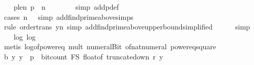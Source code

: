 \begin{isabellebody}
\isanewline
\ \ \isamarkupfalse%
\ p{\isacharunderscore}{\kern0pt}le{\isacharunderscore}{\kern0pt}n{\isacharcolon}{\kern0pt}\ {\isachardoublequoteopen}p\ {\isasymle}\ {}{\isacharasterisk}{\kern0pt}n\ {\isacharplus}{\kern0pt}\ {}{}{\isachardoublequoteclose}\isanewline
\ \ \ \ \isamarkupfalse%
\ {\isacharparenleft}{\kern0pt}simp\ add{\isacharcolon}{\kern0pt}p{\isacharunderscore}{\kern0pt}def{\isacharparenright}{\kern0pt}\isanewline
\ \ \ \ \isamarkupfalse%
\ {\isacharparenleft}{\kern0pt}cases\ {\isachardoublequoteopen}n\ {\isasymle}\ {}{}{\isachardoublequoteclose}{\isacharcomma}{\kern0pt}\ simp\ add{\isacharcolon}{\kern0pt}find{\isacharunderscore}{\kern0pt}prime{\isacharunderscore}{\kern0pt}above{\isachardot}{\kern0pt}simps{\isacharparenright}{\kern0pt}\ \isanewline
\ \ \ \ \isamarkupfalse%
\ {\isacharparenleft}{\kern0pt}rule\ order{\isacharunderscore}{\kern0pt}trans{\isacharbrackleft}{\kern0pt}\ y{\isacharequal}{\kern0pt}{\isachardoublequoteopen}{}{\isacharasterisk}{\kern0pt}n{\isacharplus}{\kern0pt}{}{\isachardoublequoteclose}{\isacharbrackright}{\kern0pt}{\isacharcomma}{\kern0pt}\ simp\ add{\isacharcolon}{\kern0pt}find{\isacharunderscore}{\kern0pt}prime{\isacharunderscore}{\kern0pt}above{\isacharunderscore}{\kern0pt}upper{\isacharunderscore}{\kern0pt}bound{\isacharbrackleft}{\kern0pt}simplified{\isacharbrackright}{\kern0pt}{\isacharparenright}{\kern0pt}\isanewline
\ \ \ \ \isamarkupfalse%
\ simp\isanewline
\isanewline
\ \ \isamarkupfalse%
\ log{\isacharunderscore}{\kern0pt}{}{\isacharunderscore}{\kern0pt}{}{\isacharcolon}{\kern0pt}\ {\isachardoublequoteopen}log\ {}\ {}\ {\isacharequal}{\kern0pt}\ {}{\isachardoublequoteclose}\ \isanewline
\ \ \ \ \isamarkupfalse%
\ {\isacharparenleft}{\kern0pt}metis\ log{}{\isacharunderscore}{\kern0pt}of{\isacharunderscore}{\kern0pt}power{\isacharunderscore}{\kern0pt}eq\ mult{\isacharunderscore}{\kern0pt}{}\ numeral{\isacharunderscore}{\kern0pt}Bit{}\ of{\isacharunderscore}{\kern0pt}nat{\isacharunderscore}{\kern0pt}numeral\ power{}{\isacharunderscore}{\kern0pt}eq{\isacharunderscore}{\kern0pt}square{\isacharparenright}{\kern0pt}\isanewline
\isanewline
\ \ \isamarkupfalse%
\ b{\isacharunderscore}{\kern0pt}{}{\isacharunderscore}{\kern0pt}{}{}{\isacharcolon}{\kern0pt}\ {\isachardoublequoteopen}{\isasymAnd}y{\isachardot}{\kern0pt}\ y\ {\isasymin}\ {\isacharbraceleft}{\kern0pt}{}{\isachardot}{\kern0pt}{\isachardot}{\kern0pt}{\isacharless}{\kern0pt}p{\isacharbraceright}{\kern0pt}\ {\isasymLongrightarrow}\ bit{\isacharunderscore}{\kern0pt}count\ {\isacharparenleft}{\kern0pt}F\isactrlsub S\ {\isacharparenleft}{\kern0pt}float{\isacharunderscore}{\kern0pt}of\ {\isacharparenleft}{\kern0pt}truncate{\isacharunderscore}{\kern0pt}down\ r\ y{\isacharparenright}{\kern0pt}{\isacharparenright}{\kern0pt}{\isacharparenright}{\kern0pt}\ {\isasymle}\ \isanewline

\end{isabellebody}
